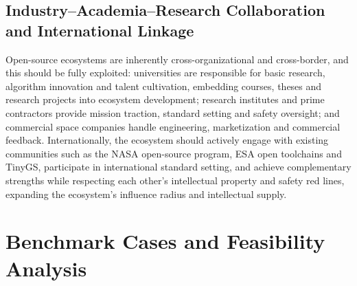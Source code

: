 \documentclass[11pt]{article}
\begin{document}
\subsection{Industry--Academia--Research Collaboration and International Linkage}
Open-source ecosystems are inherently cross-organizational and cross-border, and this should be fully exploited: universities are responsible for basic research, algorithm innovation and talent cultivation, embedding courses, theses and research projects into ecosystem development; research institutes and prime contractors provide mission traction, standard setting and safety oversight; and commercial space companies handle engineering, marketization and commercial feedback. Internationally, the ecosystem should actively engage with existing communities such as the NASA open-source program, ESA open toolchains and TinyGS, participate in international standard setting, and achieve complementary strengths while respecting each other's intellectual property and safety red lines, expanding the ecosystem's influence radius and intellectual supply.

\section{Benchmark Cases and Feasibility Analysis}
\end{document}
